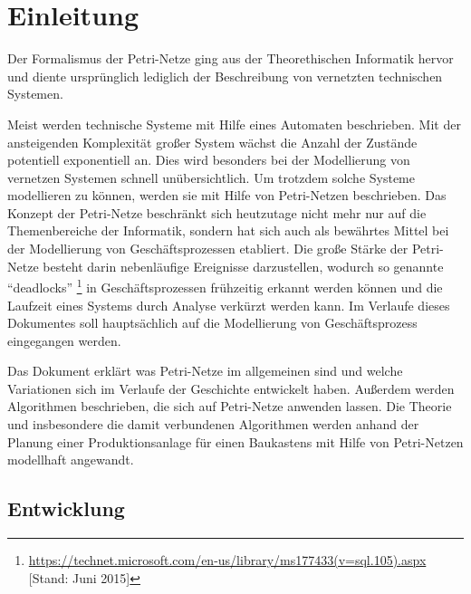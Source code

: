 \section{Einleitung}
Der Formalismus der Petri-Netze ging aus der Theorethischen Informatik hervor
und diente ursprünglich lediglich der Beschreibung von vernetzten technischen Systemen.

Meist werden technische Systeme mit Hilfe eines Automaten beschrieben.
Mit der ansteigenden Komplexität großer System wächst die Anzahl der Zustände potentiell exponentiell an.
Dies wird besonders bei der Modellierung von vernetzen Systemen schnell unübersichtlich.
Um trotzdem solche Systeme modellieren zu können, werden sie mit Hilfe von Petri-Netzen beschrieben.
Das Konzept der Petri-Netze beschränkt sich heutzutage nicht mehr nur auf die Themenbereiche der Informatik,
sondern hat sich auch als bewährtes Mittel bei der Modellierung von Geschäftsprozessen etabliert.
Die große Stärke der Petri-Netze besteht darin nebenläufige Ereignisse darzustellen,
wodurch so genannte \enquote{deadlocks} \footnote{\url{https://technet.microsoft.com/en-us/library/ms177433(v=sql.105).aspx} [Stand: Juni 2015]}
in Geschäftsprozessen frühzeitig erkannt werden können und 
die Laufzeit eines Systems durch Analyse verkürzt werden kann.
Im Verlaufe dieses Dokumentes soll hauptsächlich auf die Modellierung von Geschäftsprozess eingegangen werden. 

Das Dokument erklärt was Petri-Netze im allgemeinen sind und
welche Variationen sich im Verlaufe der Geschichte entwickelt haben.
Außerdem werden Algorithmen beschrieben, die sich auf Petri-Netze anwenden lassen.
Die Theorie und insbesondere die damit verbundenen Algorithmen
werden anhand der Planung einer Produktionsanlage für einen Baukastens
mit Hilfe von Petri-Netzen modellhaft angewandt.


\subsection{Entwicklung}
